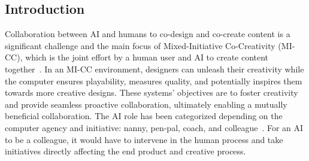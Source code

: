 \subsection{Introduction}

Collaboration between AI and humans to co-design and co-create content is a significant challenge and the main focus of Mixed-Initiative Co-Creativity (MI-CC), which is the joint effort by a human user and AI to create content together~\cite{p13yannakakis_mixed-initiative_2014,liapis_can_2016}. In an MI-CC environment, designers can unleash their creativity while the computer ensures playability, measures quality, and potentially inspires them towards more creative designs. These systems' objectives are to foster creativity and provide seamless proactive collaboration, ultimately enabling a mutually beneficial collaboration. The AI role has been categorized depending on the computer agency and initiative: nanny, pen-pal, coach, and colleague~\cite{p13lubart_how_2005}. For an AI to be a colleague, it would have to intervene in the human process and take initiatives directly affecting the end product and creative process.



 



